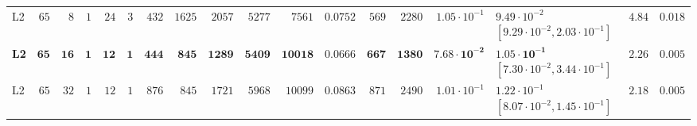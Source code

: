 \begin{table}[!htbp]
{\begin{tabular}{@{}lrrrrrrrrrrrrrrlrr@{}}
L2 & $65$ & $8$ & $1$ & $24$ & $3$ & $432$ & $1625$ & $2057$ & $5277$ & $7561$ & $0.0752$ & $569$ & $2280$ & $1.05\cdot 10^{-1}$ & $9.49\cdot 10^{-2}$ $[9.29\cdot 10^{-2}, 2.03\cdot 10^{-1}]$ & $4.84$ & $0.018$ \\
\textbf{L2} & $\mathbf{65}$ & $\mathbf{16}$ & $\mathbf{1}$ & $\mathbf{12}$ & $\mathbf{1}$ & $\mathbf{444}$ & $\mathbf{845}$ & $\mathbf{1289}$ & $\mathbf{5409}$ & $\mathbf{10018}$ & $\mathbf{0.0666}$ & $\mathbf{667}$ & $\mathbf{1380}$ & $\mathbf{7.68\cdot 10^{-2}}$ & $\mathbf{1.05\cdot 10^{-1}}$ $[7.30\cdot 10^{-2}, 3.44\cdot 10^{-1}]$ & $\mathbf{2.26}$ & $\mathbf{0.005}$ \\
L2 & $65$ & $32$ & $1$ & $12$ & $1$ & $876$ & $845$ & $1721$ & $5968$ & $10099$ & $0.0863$ & $871$ & $2490$ & $1.01\cdot 10^{-1}$ & $1.22\cdot 10^{-1}$ $[8.07\cdot 10^{-2}, 1.45\cdot 10^{-1}]$ & $2.18$ & $0.005$ \\
\bottomrule
\end{tabular}
}
\end{table}

